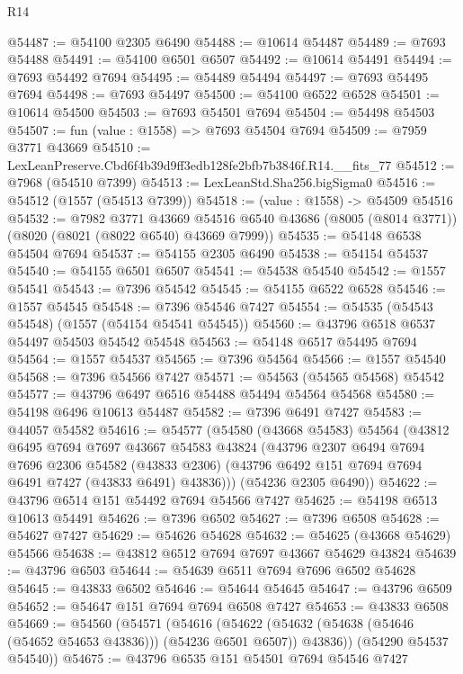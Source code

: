 \begin{lexlean}{R14}
\begin{coremodule}
@54487 := @54100 @2305 @6490
@54488 := @10614 @54487
@54489 := @7693 @54488
@54491 := @54100 @6501 @6507
@54492 := @10614 @54491
@54494 := @7693 @54492 @7694
@54495 := @54489 @54494
@54497 := @7693 @54495 @7694
@54498 := @7693 @54497
@54500 := @54100 @6522 @6528
@54501 := @10614 @54500
@54503 := @7693 @54501 @7694
@54504 := @54498 @54503
@54507 := fun (value : @1558) => @7693 @54504 @7694
@54509 := @7959 @3771 @43669
@54510 := LexLeanPreserve.Cbd6f4b39d9ff3edb128fe2bfb7b3846f.R14.__fits_77
@54512 := @7968 (@54510 @7399)
@54513 := LexLeanStd.Sha256.bigSigma0
@54516 := @54512 (@1557 (@54513 @7399))
@54518 := (value : @1558) -> @54509 @54516
@54532 := @7982
    @3771
    @43669
    @54516
    @6540
    @43686
    (@8005 (@8014 @3771))
    (@8020 (@8021 (@8022 @6540) @43669 @7999))
@54535 := @54148 @6538 @54504 @7694
@54537 := @54155 @2305 @6490
@54538 := @54154 @54537
@54540 := @54155 @6501 @6507
@54541 := @54538 @54540
@54542 := @1557 @54541
@54543 := @7396 @54542
@54545 := @54155 @6522 @6528
@54546 := @1557 @54545
@54548 := @7396 @54546 @7427
@54554 := @54535 (@54543 @54548) (@1557 (@54154 @54541 @54545))
@54560 := @43796 @6518 @6537 @54497 @54503 @54542 @54548
@54563 := @54148 @6517 @54495 @7694
@54564 := @1557 @54537
@54565 := @7396 @54564
@54566 := @1557 @54540
@54568 := @7396 @54566 @7427
@54571 := @54563 (@54565 @54568) @54542
@54577 := @43796 @6497 @6516 @54488 @54494 @54564 @54568
@54580 := @54198 @6496 @10613 @54487
@54582 := @7396 @6491 @7427
@54583 := @44057 @54582
@54616 := @54577
    (@54580
      (@43668 @54583)
      @54564
      (@43812
        @6495
        @7694
        @7697
        @43667
        @54583
        @43824
        (@43796
          @2307
          @6494
          @7694
          @7696
          @2306
          @54582
          (@43833 @2306)
          (@43796 @6492 @151 @7694 @7694 @6491 @7427 (@43833 @6491) @43836)))
      (@54236 @2305 @6490))
@54622 := @43796 @6514 @151 @54492 @7694 @54566 @7427
@54625 := @54198 @6513 @10613 @54491
@54626 := @7396 @6502
@54627 := @7396 @6508
@54628 := @54627 @7427
@54629 := @54626 @54628
@54632 := @54625 (@43668 @54629) @54566
@54638 := @43812 @6512 @7694 @7697 @43667 @54629 @43824
@54639 := @43796 @6503
@54644 := @54639 @6511 @7694 @7696 @6502 @54628
@54645 := @43833 @6502
@54646 := @54644 @54645
@54647 := @43796 @6509
@54652 := @54647 @151 @7694 @7694 @6508 @7427
@54653 := @43833 @6508
@54669 := @54560
    (@54571
      (@54616
        (@54622 (@54632 (@54638 (@54646 (@54652 @54653 @43836))) (@54236 @6501 @6507)) @43836))
      (@54290 @54537 @54540))
@54675 := @43796 @6535 @151 @54501 @7694 @54546 @7427

\end{coremodule}
\end{lexlean}
